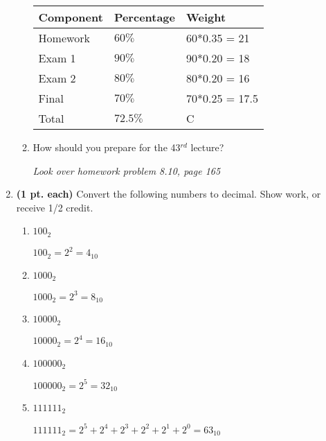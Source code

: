 \begin{enumerate}
\begin{enumerate}
	\begin{onlysolution}
	\itshape
                \begin{tabular}{l|l|l}
                Component & Percentage & Weight \\ \hline \hline
                Homework & $60\%$    & 60*0.35 = 21\\ \hline
                Exam 1   & $90\%$    & 90*0.20 = 18\\ \hline
                Exam 2   & $80\%$    & 80*0.20 = 16\\ \hline
                Final    & $70\%$    & 70*0.25 = 17.5 \\ \hline
                Total    & $72.5\%$ & C \\
                \end{tabular}
	\end{onlysolution}

	\item How should you prepare for the 43$^{rd}$ lecture?

	\begin{onlysolution}
	\itshape
	 Look over homework problem 8.10, page 165
	 \end{onlysolution}
	 
	\end{enumerate}

\item \textbf{ (1 pt. each)} Convert the following numbers to decimal. 
Show work, or receive 1/2 credit.
	\begin{enumerate}
	\item $100_2$
	\begin{onlysolution}	\itshape $100_2 = 2^2 = 4_{10}$\end{onlysolution}
	
	\item $1000_2$
	\begin{onlysolution}	\itshape $1000_2 = 2^3 = 8_{10}$\end{onlysolution}
	
	\item $10000_2$
	\begin{onlysolution}	\itshape $10000_2 = 2^4 = 16_{10}$\end{onlysolution}
	
	\item $100000_2$
	\begin{onlysolution}	\itshape $100000_2 = 2^5 = 32_{10}$\end{onlysolution}
	
	\item $111111_2$
	\begin{onlysolution}	\itshape $111111_2 = 2^5+2^4+2^3+2^2+2^1+2^0=63_{10}$\end{onlysolution}
	

\end{enumerate}
\end{enumerate}
